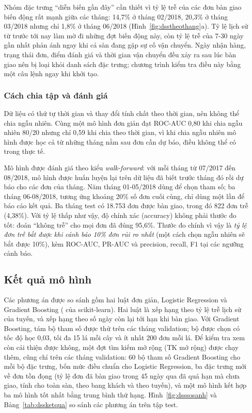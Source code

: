 Nhóm đặc trưng ``diễn biến gần đây'' cần thiết vì tỷ lệ trễ của các đơn bàn giao biến động rất mạnh giữa các tháng: 14,7\% ở tháng 02/2018, 20,3\% ở tháng 03/2018 nhưng chỉ 1,8\% ở tháng 06/2018 (Hình~\ref{fig:dsstheothang}a). Tỷ lệ lịch sử từ trước tới nay làm mờ đi những đợt biến động này, còn tỷ lệ trễ của 7-30 ngày gần nhất phản ánh ngay khi cả sàn đang gặp sự cố vận chuyển. Ngày nhận hàng, trạng thái đơn, điểm đánh giá và thời gian vận chuyển đều xảy ra sau lúc bàn giao nên bị loại khỏi danh sách đặc trưng; chương trình kiểm tra điều này bằng một câu lệnh  ngay khi khởi tạo.

\subsubsection{Cách chia tập và đánh giá}

Dữ liệu có thứ tự thời gian và thay đổi tính chất theo thời gian, nên không thể chia ngẫu nhiên. Cùng một mô hình đơn giản đạt ROC-AUC 0,80 khi chia ngẫu nhiên 80/20 nhưng chỉ 0,59 khi chia theo thời gian, vì khi chia ngẫu nhiên mô hình được học cả từ những tháng nằm sau đơn cần dự báo, điều không thể có trong thực tế.

Mô hình được đánh giá theo kiểu \textit{walk-forward}: với mỗi tháng từ 07/2017 đến 08/2018, mô hình được huấn luyện lại trên dữ liệu đã biết trước tháng đó rồi dự báo cho các đơn của tháng. Năm tháng 01-05/2018 dùng để chọn tham số; ba tháng 06-08/2018, tương ứng khoảng 20\% số đơn cuối cùng, chỉ dùng một lần để báo cáo kết quả. Ba tháng test có 18.753 đơn được bàn giao, trong đó 822 đơn trễ (4,38\%). Với tỷ lệ thấp như vậy, độ chính xác (accuracy) không phải thước đo tốt: đoán ``không trễ'' cho mọi đơn đã đúng 95,6\%. Thước đo chính vì vậy là \textit{tỷ lệ đơn trễ bắt được khi cảnh báo 10\% đơn rủi ro nhất} (một cách chọn ngẫu nhiên sẽ bắt được 10\%), kèm ROC-AUC, PR-AUC và precision, recall, F1 tại các ngưỡng cảnh báo.

\subsection{Kết quả mô hình}\label{sec:dssketqua}

Các phương án được so sánh gồm hai luật đơn giản, Logistic Regression và Gradient Boosting ( của scikit-learn). Hai luật là xếp hạng theo tỷ lệ trễ lịch sử của tuyến, và xếp hạng theo số ngày còn lại tới hạn khi bàn giao. Với Gradient Boosting, tám bộ tham số được thử trên các tháng validation; bộ được chọn có tốc độ học 0,03, tối đa 15 lá mỗi cây và ít nhất 200 đơn mỗi lá. Để kiểm tra xem còn cải thiện được không, một đợt tìm kiếm mở rộng (TK mở rộng) được chạy thêm, cũng chỉ trên các tháng validation: 60 bộ tham số Gradient Boosting cho mỗi bộ đặc trưng, bốn mức điều chuẩn cho Logistic Regression, ba đặc trưng mới về đơn tồn đọng (tỷ lệ đơn đã bàn giao trong 45 ngày qua đã quá hạn mà chưa giao, tính cho toàn sàn, theo bang khách và theo tuyến), và một mô hình kết hợp ba mô hình tốt nhất bằng trung bình thứ hạng. Hình~\ref{fig:dsssosanh} và Bảng~\ref{tab:dssketqua} so sánh các phương án trên tập test.

